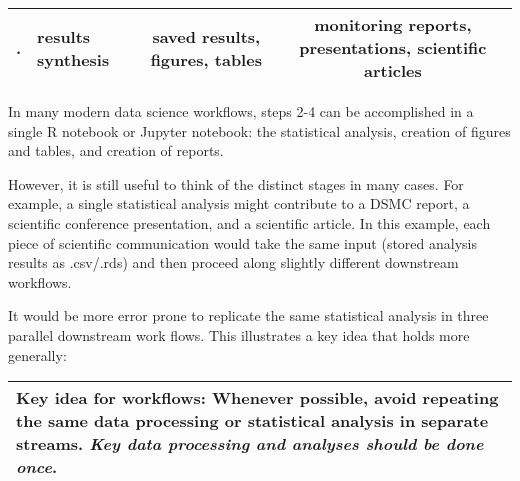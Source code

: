\documentclass[]{book}
\begin{document}
\begin{longtable}[]{@{}clcc@{}}
\begin{minipage}[t]{0.07\columnwidth}
.\strut
\end{minipage} & \begin{minipage}[t]{0.25\columnwidth}\raggedright
results synthesis\strut
\end{minipage} & \begin{minipage}[t]{0.28\columnwidth}\centering
saved results, figures, tables\strut
\end{minipage} & \begin{minipage}[t]{0.29\columnwidth}\centering
monitoring reports, presentations, scientific articles\strut
\end{minipage}\tabularnewline
\bottomrule
\end{longtable}

In many modern data science workflows, steps 2-4 can be accomplished in a single R notebook or Jupyter notebook: the statistical analysis, creation of figures and tables, and creation of reports.

However, it is still useful to think of the distinct stages in many cases. For example, a single statistical analysis might contribute to a DSMC report, a scientific conference presentation, and a scientific article. In this example, each piece of scientific communication would take the same input (stored analysis results as .csv/.rds) and then proceed along slightly different downstream workflows.

It would be more error prone to replicate the same statistical analysis in three parallel downstream work flows. This illustrates a key idea that holds more generally:

\begin{longtable}[]{@{}l@{}}
\toprule
\endhead
\textbf{Key idea for workflows:} Whenever possible, avoid repeating the same data processing or statistical analysis in separate streams. \emph{Key data processing and analyses should be done once}.\tabularnewline
\bottomrule
\end{longtable}


\end{document}
